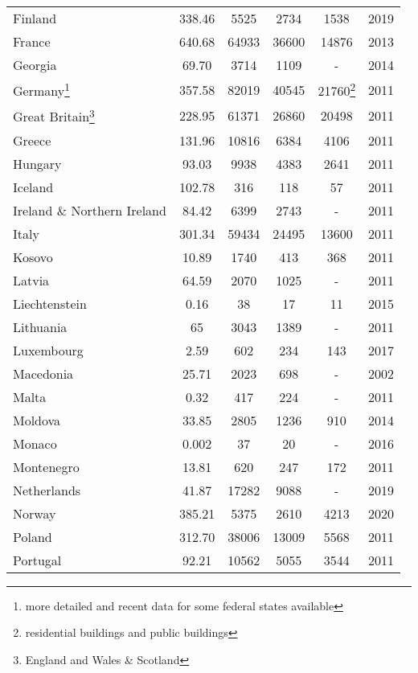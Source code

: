 \documentclass[final, 3p, times, 12pt]{elsarticle} %
\begin{document}
\begin{table}
\begin{minipage}{\textwidth}
\begin{center}
\begin{tabular}{ |l|S[table-format=4.2]|S[table-format=5.0]|S[table-format=5.0]|S[table-format=5.0]|c|}
 Finland & 338.46 & 5525 & 2734 & 1538 & 2019\\
 France & 640.68 & 64933 & 36600 & 14876 & 2013\\
 Georgia & 69.70 & 3714 & 1109 & {-} & 2014\\
 Germany\footnote{more detailed and recent data for some federal states available} & 357.58 & 82019 & 40545 & 21760{\footnote{residential buildings and public buildings}} & 2011\\
 Great Britain\footnote{England and Wales \& Scotland} & 228.95 & 61371 & 26860 & 20498 & 2011\\
 Greece & 131.96 & 10816 & 6384 & 4106 & 2011\\
 Hungary & 93.03 & 9938 & 4383 & 2641 & 2011\\
 Iceland & 102.78 & 316 & 118 & 57 & 2011\\
 Ireland \& Northern Ireland & 84.42 & 6399 & 2743 & {-} & 2011\\
 Italy & 301.34 & 59434 & 24495 & 13600 & 2011\\
 Kosovo & 10.89 & 1740 & 413 & 368 & 2011\\
 Latvia & 64.59 & 2070 & 1025 & {-} & 2011\\
 Liechtenstein & 0.16 &	38 & 17 & 11 & 2015\\
 Lithuania & 65 & 3043 & 1389 & {-} & 2011\\
 Luxembourg & 2.59 & 602 & 234 & 143 & 2017\\
 Macedonia & 25.71 & 2023 & 698 & {-} & 2002\\
 Malta & 0.32 & 417 & 224 & {-} & 2011\\
 Moldova & 33.85 & 2805 & 1236 & 910 & 2014\\
 Monaco & 0.002 & 37 & 20 & {-} & 2016\\
 Montenegro & 13.81 & 620 & 247 & 172 & 2011\\
 Netherlands & 41.87 & 17282 & 9088 & {-} & 2019\\
 Norway & 385.21 & 5375 & 2610 & 4213 & 2020\\
 Poland & 312.70 & 38006 & 13009 & 5568 & 2011\\
 Portugal & 92.21 & 10562 & 5055 & 3544 & 2011\\

\end{tabular}
\end{center}
\end{minipage}
\end{table}
\end{document}
